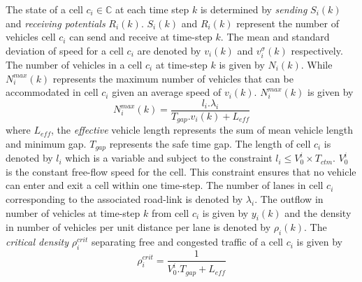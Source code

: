 \documentclass[12pt]{article}
\begin{document}
The state of a cell $c_i\in \mathbb{C}$ at each time step $k$ is determined by {\it sending} $S_i(k)$ and {\it receiving potentials} $R_i(k)$. $S_i(k)$ and $R_i(k)$ represent the number of vehicles cell $c_i$ can send and receive at time-step $k$. The mean and standard deviation of speed for a cell $c_i$ are denoted by $v_i(k)$ and $v_i^{\sigma}(k)$ respectively.  The number of vehicles in a cell $c_i$ at time-step $k$ is given by $N_{i}(k)$. While $N_i^{max}(k)$ represents the maximum number of vehicles that can be accommodated in cell $c_i$ given an average speed of $v_i(k)$. $N_i^{max}(k)$ is given by
\begin{equation}
\label{eq:nmax}
N_i^{max}(k)=\frac{l_i.\lambda_i}{T_{gap}.v_{i}(k)+ L_{eff}}
\end{equation}
where $L_{eff}$, the {\it effective} vehicle length represents the sum of mean vehicle length and minimum gap. $T_{gap}$ represents the safe time gap.
The length of cell $c_i$ is denoted by $l_i$ which is a variable and subject to the constraint $l_i \le V_0^i\times T_{ctm}$. $V_0^i$ is the constant free-flow speed for the cell. This constraint ensures that no vehicle can enter and exit a cell within one time-step. The number of lanes in cell $c_i$ corresponding to the associated road-link is denoted by $\lambda_i$. The outflow in number of vehicles at time-step $k$ from cell $c_i$ is given by $y_i(k)$ and the density in number of vehicles per unit distance per lane is denoted by $\rho_i(k)$. The {\it critical density} $\rho^{crit}_i$ separating free and congested traffic of a cell $c_i$ is given by 
\begin{equation}
\label{eq:critden}
\rho^{crit}_i=\frac{1}{V_0^i.T_{gap}+L_{eff}}
\end{equation}
\end{document}
